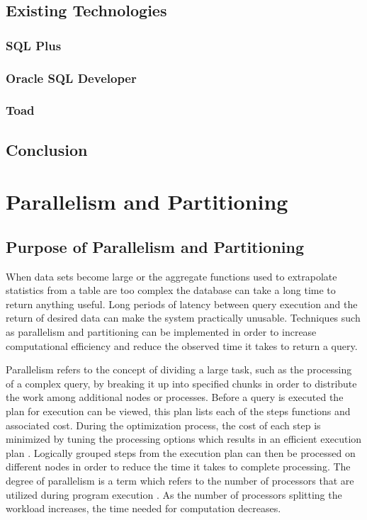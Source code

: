 \documentclass[draftclsnofoot, onecolumn, compsoc, 10pt]{IEEEtran}
\begin{document}
\subsection{Existing Technologies}

\subsubsection{SQL Plus}

\subsubsection{Oracle SQL Developer}

\subsubsection{Toad}

\subsection{Conclusion}

\section{Parallelism and Partitioning}

\subsection{Purpose of Parallelism and Partitioning}
When data sets become large or the aggregate functions used to extrapolate statistics from a table are too complex the database can take a long time to return anything useful.
Long periods of latency between query execution and the return of desired data can make the system practically unusable. 
Techniques such as parallelism and partitioning can be implemented in order to increase computational efficiency and reduce the observed time it takes to return a query. 

Parallelism refers to the concept of dividing a large task, such as the processing of a complex query, by breaking it up into specified chunks in order to distribute the work among additional nodes or processes.
Before a query is executed the plan for execution can be viewed, this plan lists each of the steps functions and associated cost.
During the optimization process, the cost of each step is minimized by tuning the processing options which results in an efficient execution plan \cite{Optimizer Concepts}.
Logically grouped steps from the execution plan can then be processed on different nodes in order to reduce the time it takes to complete processing.
The degree of parallelism is a term which refers to the number of processors that are utilized during program execution  \cite{Query Optimization In Relational Systems}.
As the number of processors splitting the workload increases, the time needed for computation decreases.
\end{document}
